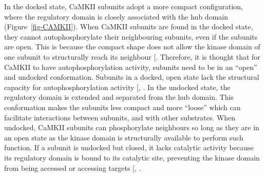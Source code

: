 \documentclass[
  11pt,
  letterpaper,
]{scrreprt}
\begin{document}
In the docked state, CaMKII subunits adopt a more compact configuration,
where the regulatory domain is closely associated with the hub domain
(Figure~\ref{fig-CAMKII}). When CaMKII subunits are found in the docked
state, they cannot autophosphorylate their neighbouring subunits, even
if the subunits are open. This is because the compact shape does not
allow the kinase domain of one subunit to structurally reach its
neighbour
{[}\citeproc{ref-rosenberg2005StructureAutoinhibitedKinase}{162}{]}.
Therefore, it is thought that for CaMKII to have autophosphorylation
activity, subunits need to be in an ``open'' and undocked conformation.
Subunits in a docked, open state lack the structural capacity for
autophosphorylation activity {[},
\citeproc{ref-myers2017CaMKII}{164}{]}. In the undocked state, the
regulatory domain is extended and separated from the hub domain. This
conformation makes the subunits less compact and more ``loose'' which
can facilitate interactions between subunits, and with other substrates.
When undocked, CaMKII subunits can phosphorylate neighbours so long as
they are in an open state as the kinase domain is structurally available
to perform such function. If a subunit is undocked but closed, it lacks
catalytic activity because its regulatory domain is bound to its
catalytic site, preventing the kinase domain from being accessed or
accessing targets {[},
\citeproc{ref-chao2011Mechanism}{177}{]}.
\end{document}
